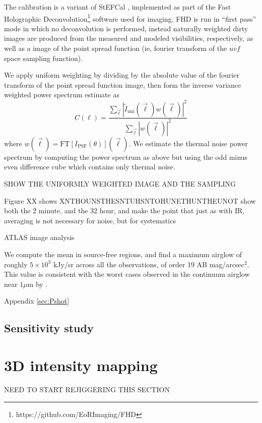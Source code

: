 \documentclass[preprint]{aastex}
\begin{document}
The calibration is a variant of StEFCal \citep{stefcal}, implemented as part of the Fast Holographic Deconvolution\footnote{https://github.com/EoRImaging/FHD} \citep{fhd} software used for imaging. FHD is run in ``first pass'' mode in which no deconvolution is performed, instead naturally weighted dirty images are produced from the measured and modeled visibilities, respectively, as well as a image of the point spread function (ie, fourier transform of the $uvf$ space sampling function). 

We apply uniform weighting by dividing by the absolute value of the fourier transform of the point spread function image, then form the inverse variance weighted power spectrum estimate as
\begin{equation}
	C(\ell)=\frac{\sum_{\vec{\ell}}|\tilde{I}_\text{uni}(\vec{\ell})w(\vec{\ell})|^2}{\sum_{\vec{\ell}}|w(\vec{\ell})|^2}
\end{equation}
where $w(\vec{\ell})=\text{FT}[I_\text{PSF}(\theta)](\vec{\ell})$. We estimate the thermal noise power spectrum by computing the power spectrum as above but using the odd minus even difference cube which contains only thermal noise.

SHOW THE UNIFORMLY WEIGHTED IMAGE AND THE SAMPLING

Figure XX shows XNTHOUNSTHESNTUHSNTOHUNETHUNTHEUNOT
	show both the 2 minute, and the 32 hour, and make the point that just as with IR, averaging is not necessary for noise, but for systematics



ATLAS image analysis



We compute the mean in source-free regions, and find a maximum airglow of roughly $5\times10^3$ kJy/sr across all the observations, of order 19 AB mag/arcsec$^2$. This value is consistent with the worst cases observed in the continuum airglow near $1\mu$m by \citet{sullivan12}.

Appendix \ref{sec:Pshot}

\subsection{Sensitivity study}


\section{3D intensity mapping}

NEED TO START REJIGGERING THIS SECTION
\end{document}
